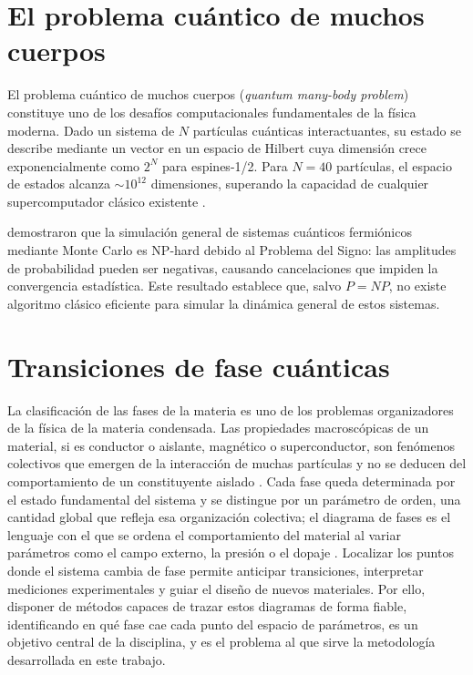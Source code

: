\documentclass[11pt,a4paper,spanish]{book}
\begin{document}
\section{El problema cuántico de muchos cuerpos}

El problema cuántico de muchos cuerpos (\emph{quantum many-body problem}) constituye uno de los desafíos computacionales fundamentales de la física moderna. Dado un sistema de $N$ partículas cuánticas interactuantes, su estado se describe mediante un vector en un espacio de Hilbert cuya dimensión crece exponencialmente como $2^N$ para espines-1/2. Para $N = 40$ partículas, el espacio de estados alcanza $\sim 10^{12}$ dimensiones, superando la capacidad de cualquier supercomputador clásico existente \citep{feynman1982}.

\citet{troyer2005} demostraron que la simulación general de sistemas cuánticos fermiónicos mediante Monte Carlo es NP-hard debido al Problema del Signo: las amplitudes de probabilidad pueden ser negativas, causando cancelaciones que impiden la convergencia estadística. Este resultado establece que, salvo $P = NP$, no existe algoritmo clásico eficiente para simular la dinámica general de estos sistemas.

\section{Transiciones de fase cuánticas}

La clasificación de las fases de la materia es uno de los problemas organizadores de la física de la materia condensada. Las propiedades macroscópicas de un material, si es conductor o aislante, magnético o superconductor, son fenómenos colectivos que emergen de la interacción de muchas partículas y no se deducen del comportamiento de un constituyente aislado \citep{anderson1972}. Cada fase queda determinada por el estado fundamental del sistema y se distingue por un parámetro de orden, una cantidad global que refleja esa organización colectiva; el diagrama de fases es el lenguaje con el que se ordena el comportamiento del material al variar parámetros como el campo externo, la presión o el dopaje \citep{sachdev2011}. Localizar los puntos donde el sistema cambia de fase permite anticipar transiciones, interpretar mediciones experimentales y guiar el diseño de nuevos materiales. Por ello, disponer de métodos capaces de trazar estos diagramas de forma fiable, identificando en qué fase cae cada punto del espacio de parámetros, es un objetivo central de la disciplina, y es el problema al que sirve la metodología desarrollada en este trabajo.
\end{document}

